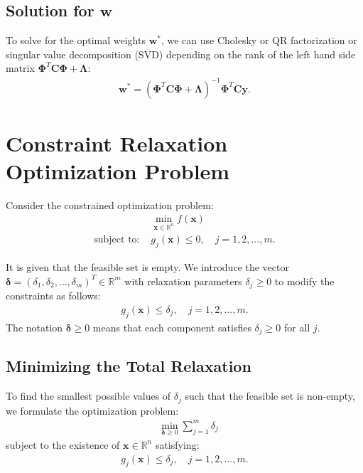 \documentclass[12pt]{article}
\begin{document}
\subsection{Solution for \( \mathbf{w} \)}

To solve for the optimal weights \( \mathbf{w^*} \), we can use Cholesky or QR factorization or singular value decomposition (SVD) depending on the rank of the left hand side matrix $\mathbf{\Phi}^T \mathbf{C} \mathbf{\Phi} + \mathbf{\Lambda}$:
\begin{align*}
    \mathbf{w^*} = (\mathbf{\Phi}^T \mathbf{C} \mathbf{\Phi} + \mathbf{\Lambda})^{-1} \mathbf{\Phi}^T \mathbf{C} \mathbf{y}.
\end{align*}

\section{Constraint Relaxation Optimization Problem}
Consider the constrained optimization problem:
\begin{align*}
    &\min_{\mathbf{x} \in \mathbb{R}^n} f(\mathbf{x}) \\
    \text{subject to: } & g_j(\mathbf{x}) \leq 0, \quad j = 1,2,\dots,m.
\end{align*}

It is given that the feasible set is empty. We introduce the vector $\boldsymbol{\delta} = (\delta_1, \delta_2, \dots, \delta_m)^T \in \mathbb{R}^m$ with relaxation parameters $\delta_j \geq 0$ to modify the constraints as follows:
\begin{align*}
    g_j(\mathbf{x}) \leq \delta_j, \quad j = 1,2,\dots,m.
\end{align*}
The notation $\boldsymbol{\delta} \geq 0$ means that each component satisfies $\delta_j \geq 0$ for all $j$.

\subsection{Minimizing the Total Relaxation}
To find the smallest possible values of $\delta_j$ such that the feasible set is non-empty, we formulate the optimization problem:
\begin{align*}
    &\min_{\boldsymbol{\delta} \geq 0} \sum_{j=1}^{m} \delta_j
\end{align*}
subject to the existence of $\mathbf{x} \in \mathbb{R}^n$ satisfying:
\begin{align*}
    g_j(\mathbf{x}) \leq \delta_j, \quad j = 1,2,\dots,m.
\end{align*}
\end{document}
